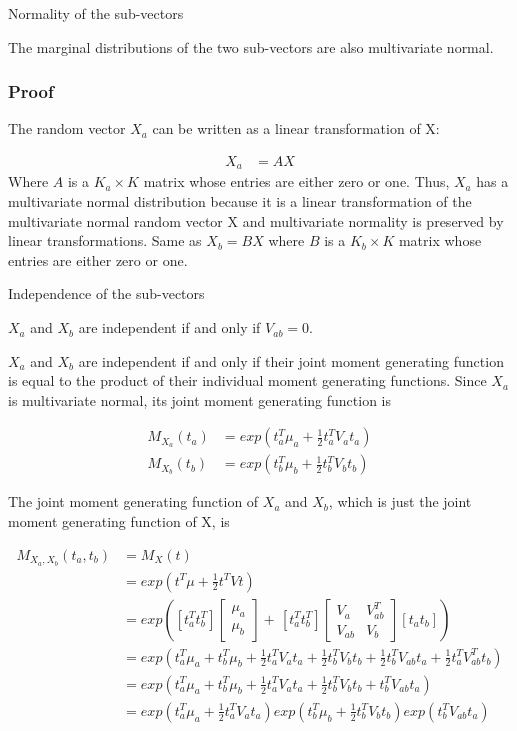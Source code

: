 \documentclass[11pt]{article} %
\begin{document}
Normality of the sub-vectors

The marginal distributions of the two sub-vectors are also multivariate normal.

\subsubsection{Proof}
The random vector $X_a$ can be written as a linear transformation of X:

\begin{align*}
	X_a &= A X
\end{align*}
Where $A$ is a $K_a \times K$ matrix whose entries are either zero or one. Thus, $X_a $ has a multivariate normal distribution because it is a linear transformation of the multivariate normal random vector X and multivariate normality is preserved by linear transformations. Same as $X_b = B X$ where $B$ is a $K_b \times K$ matrix whose entries are either zero or one. 



Independence of the sub-vectors

$X_a$ and $X_b$ are independent if and only if $V_{ab} = 0$.

$X_a$ and $X_b$ are independent if and only if their joint moment generating function is equal to the product of their individual moment generating functions. Since $X_a$ is multivariate normal, its joint moment generating function is 

\begin{align*}
	M_{X_a}(t_a) &= exp(t^T_a \mu_a + \frac{1}{2} t_a^T V_a t_a) \\
	M_{X_b}(t_b) &= exp(t^T_b \mu_b + \frac{1}{2} t_b^T V_b t_b) 
\end{align*}

The joint moment generating function of $X_a$ and $X_b$, which is just the joint moment generating function of X, is

\begin{align*}
	M_{X_a, X_b}(t_a, t_b) &= M_{X}(t) \\
	&= exp(t^T \mu + \frac{1}{2} t^T V t) \\
	&= exp \left( [t_a^T t_b^T] \begin{bmatrix}
		\mu_a \\
		\mu_b
	\end{bmatrix} + \frac{}{} [t_a^T t_b^T] \begin{bmatrix}
	V_a & V_{ab}^T \\
	V_{ab} & V_b
\end{bmatrix} [t_a t_b] \right) \\
&= exp \left( t_a^T \mu_a + t_b^T \mu_b + \frac{1}{2} t_a^T V_a t_a + \frac{1}{2} t_b^T V_b t_b + \frac{1}{2} t_b^T V_{ab} t_a + \frac{1}{2} t_a^T V_{ab}^T t_b \right) \\
&= exp \left( t_a^T \mu_a + t_b^T \mu_b + \frac{1}{2} t_a^T V_a t_a + \frac{1}{2} t_b^T V_b t_b +  t_b^T V_{ab} t_a  \right) \\
&= exp \left( t_a^T \mu_a + \frac{1}{2} t_a^T V_a t_a \right) exp \left( t_b^T \mu_b + \frac{1}{2} t_b^T V_b t_b \right) exp( t_b^T V_{ab} t_a)
\end{align*}
\end{document}
